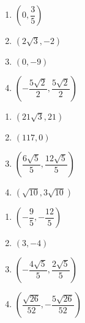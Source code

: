 \documentclass{ximera}
\begin{document}
\begin{multicols}{4} 

\begin{enumerate}

\setcounter{enumi}{\value{HW}}

\item $\left( 0, \dfrac{3}{5} \right)$ 
\item $\left( 2\sqrt{3}, -2 \right)$ 
\item $\left( 0, -9 \right)$ 
\item $\left( -\dfrac{5\sqrt{2}}{2}, \dfrac{5\sqrt{2}}{2} \right)$

\setcounter{HW}{\value{enumi}}

\end{enumerate}

\end{multicols}

\begin{multicols}{4} 

\begin{enumerate}

\setcounter{enumi}{\value{HW}}

\item $\left( 21\sqrt{3}, 21 \right)$ 
\item $\left(117, 0 \right)$ 
\item $\left( \dfrac{6\sqrt{5}}{5}, \dfrac{12\sqrt{5}}{5} \right)$ 
\item $\left(\sqrt{10}, 3\sqrt{10} \right)$ 

\setcounter{HW}{\value{enumi}}

\end{enumerate}

\end{multicols}

\begin{multicols}{4} 

\begin{enumerate}

\setcounter{enumi}{\value{HW}}

\item $\left( -\dfrac{9}{5}, -\dfrac{12}{5} \right)$  
\item $\left( 3,-4 \right)$  
\item $\left( -\dfrac{4\sqrt{5}}{5}, \dfrac{2\sqrt{5}}{5} \right)$ 
\item $\left( \dfrac{\sqrt{26}}{52}, -\dfrac{5\sqrt{26}}{52} \right)$ 

\setcounter{HW}{\value{enumi}}

\end{enumerate}

\end{multicols}
\end{document}
